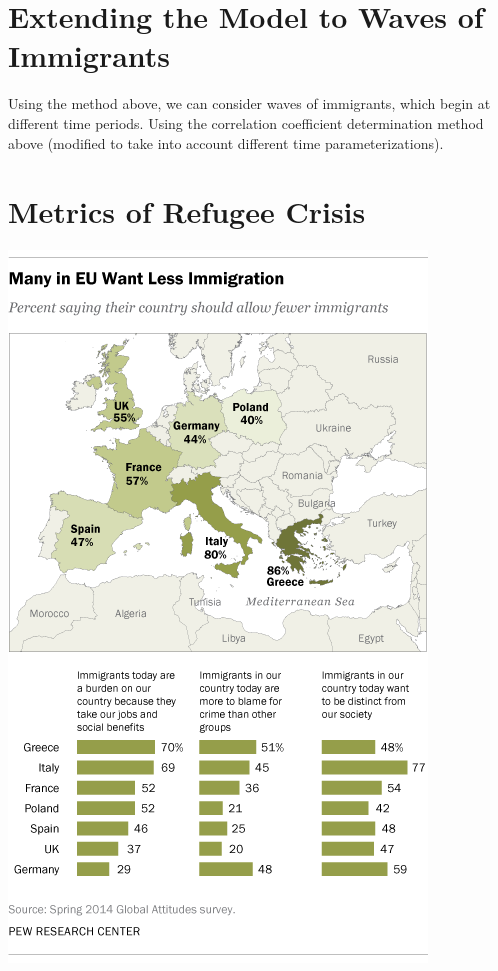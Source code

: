\documentclass{article}
\begin{document}
\section{Extending the Model to Waves of Immigrants}

Using the method above, we can consider waves of immigrants, which begin at different time periods. Using the correlation coefficient determination method above (modified to take into account different time parameterizations).

\section{Metrics of Refugee Crisis}

\begin{center}
\includegraphics[scale=0.5]{ImmigrationPoll}
\end{center}
\end{document}
